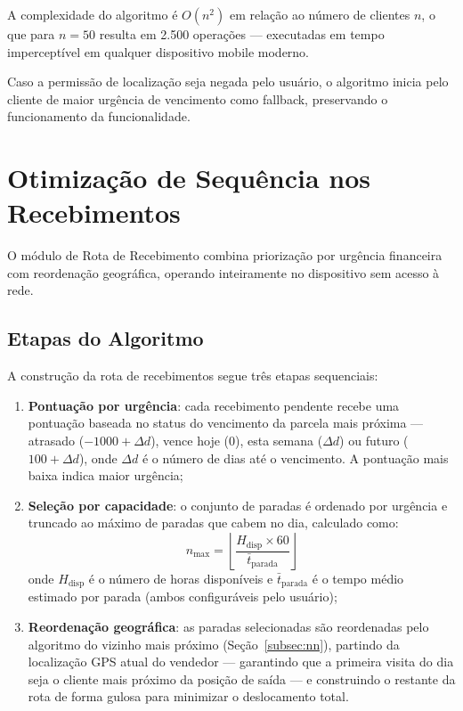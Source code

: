 \documentclass[
	12pt,				%
	oneside,			%
	a4paper,			%
	english,			%
	brazil				%
	]{abntex2}
\begin{document}
A complexidade do algoritmo é $O(n^2)$ em relação ao número de clientes $n$, o que para $n = 50$ resulta em 2.500 operações — executadas em tempo imperceptível em qualquer dispositivo mobile moderno.

Caso a permissão de localização seja negada pelo usuário, o algoritmo inicia pelo cliente de maior urgência de vencimento como fallback, preservando o funcionamento da funcionalidade.

\section{Otimização de Sequência nos Recebimentos}

O módulo de Rota de Recebimento combina priorização por urgência financeira com reordenação geográfica, operando inteiramente no dispositivo sem acesso à rede.

\subsection{Etapas do Algoritmo}

A construção da rota de recebimentos segue três etapas sequenciais:

\begin{enumerate}
  \item \textbf{Pontuação por urgência}: cada recebimento pendente recebe uma pontuação baseada no status do vencimento da parcela mais próxima — atrasado ($-1000 + \Delta d$), vence hoje ($0$), esta semana ($\Delta d$) ou futuro ($100 + \Delta d$), onde $\Delta d$ é o número de dias até o vencimento. A pontuação mais baixa indica maior urgência;

  \item \textbf{Seleção por capacidade}: o conjunto de paradas é ordenado por urgência e truncado ao máximo de paradas que cabem no dia, calculado como:
  \begin{equation}
    n_{\max} = \left\lfloor \frac{H_{\text{disp}} \times 60}{\bar{t}_{\text{parada}}} \right\rfloor
    \label{eq:maxstops}
  \end{equation}
  onde $H_{\text{disp}}$ é o número de horas disponíveis e $\bar{t}_{\text{parada}}$ é o tempo médio estimado por parada (ambos configuráveis pelo usuário);

  \item \textbf{Reordenação geográfica}: as paradas selecionadas são reordenadas pelo algoritmo do vizinho mais próximo (Seção~\ref{subsec:nn}), partindo da localização GPS atual do vendedor — garantindo que a primeira visita do dia seja o cliente mais próximo da posição de saída — e construindo o restante da rota de forma gulosa para minimizar o deslocamento total.
\end{enumerate}
\end{document}
